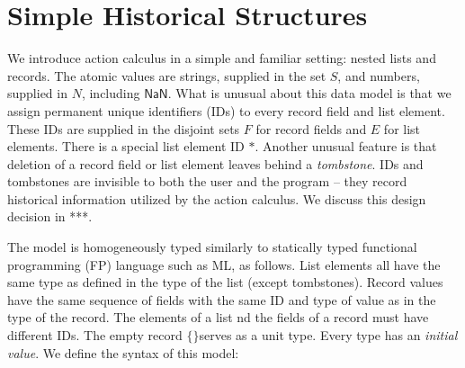 \documentclass[english,submission]{programming}
\theoremstyle{definition}
\newcommand{\mathbox}[1]{\colorbox{black!10}{$#1$}}
\newcommand{\emptystring}{\textsf{\textquotedbl\ \!\textquotedbl}}
\begin{document}
\section{Simple Historical Structures}

We introduce action calculus in a simple and familiar setting: nested lists and records. The atomic values are strings, supplied in the set \mathbox{S}, and numbers, supplied in \mathbox{N}, including \mathbox{\textsf{NaN}}. What is unusual about this data model is that we assign permanent unique identifiers (IDs) to every record field and list element. These IDs are supplied in the disjoint sets \mathbox{F} for record fields and \mathbox{E} for list elements. There is a special list element ID \mathbox{*}. Another unusual feature is that deletion of a record field or list element leaves behind a \textit{tombstone}. IDs and tombstones are invisible to both the user and the program -- they record historical information utilized by the action calculus. We discuss this design decision in ***.

The model is homogeneously typed similarly to statically typed functional programming (FP) language such as ML, as follows. List elements all have the same type as defined in the type of the list (except tombstones). Record values have the same sequence of fields with the same ID and type of value as in the type of the record. The elements of a list nd the fields of a record must have different IDs.
The empty record \mathbox{\text{\{\}}}serves as a unit type. Every type has an \textit{initial value}. We define the syntax of this model:

\tcbox{
\[ \begin{array}{rl|rl|rl|l}
  \multicolumn{2}{l|}{\textrm{type}} & \multicolumn{2}{l|}{\textrm{value}} & \multicolumn{2}{l|}{\textrm{initial value}}&\\
  \hline
  T \Coloneqq & & v \Coloneqq & & T^\varnothing = & &\\
  &  \textsf{String} & & S & & \emptystring & \textrm{string}\\
  & \textsf{Number} & &  N & & \textsf{NaN} & \textrm{number}\\
  & \textsf{List } T & & [ E : v \  \dots ] & & [] & \textrm{list}\\
  & \{ F : T \  \dots \} & & \{ F : v \  \dots \} & & \{ F : T^\varnothing \  \dots \}& \textrm{record}\\

  & \bot && \bigtimes & & \bigtimes & \textrm{tombstone}\\
\end{array}\]
}
\end{document}
